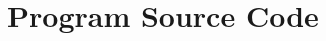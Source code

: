 \documentclass[11pt,oneside,a4paper,final]{article}
\begin{document}


\appendix
\section{Program Source Code}
\label{sec:Program Source Code}

\begin{center}
  
\end{center}

% 
% 
\end{document}
